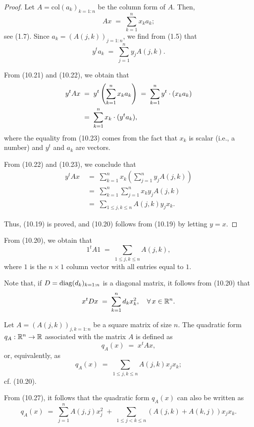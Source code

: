 \begin{proof}
Let $A = \mathrm{col}(a_k)_{k=1:n}$ be the column form of $A$. Then,
\begin{equation}
Ax \;=\; \sum_{k=1}^n x_ka_k;
\end{equation}
see (1.7). Since $a_k = (A(j,k))_{j=1:n}$, we find from (1.5) that
\begin{equation}
y^ta_k \;=\; \sum_{j=1}^n y_jA(j,k).
\end{equation}

From (10.21) and (10.22), we obtain that
\begin{align}
y^tAx \;&=\; y^t\left(\sum_{k=1}^n x_ka_k\right) \;=\; \sum_{k=1}^n y^t\cdot(x_ka_k) \notag \\
&=\; \sum_{k=1}^n x_k\cdot(y^ta_k),
\end{align}
where the equality from (10.23) comes from the fact that $x_k$ is scalar (i.e., a
number) and $y^t$ and $a_k$ are vectors.

From (10.22) and (10.23), we conclude that
\begin{align*}
y^tAx \;&=\; \sum_{k=1}^n x_k\left(\sum_{j=1}^n y_jA(j,k)\right) \\
&=\; \sum_{k=1}^n\sum_{j=1}^n x_ky_jA(j,k) \\
&=\; \sum_{1\le j,k\le n} A(j,k)y_jx_k.
\end{align*}

Thus, (10.19) is proved, and (10.20) follows from (10.19) by letting $y = x$.
\end{proof}

From (10.20), we obtain that
\begin{equation}
1^tA1 \;=\; \sum_{1\le j,k\le n} A(j,k),
\end{equation}
where $1$ is the $n \times 1$ column vector with all entries equal to $1$.

Note that, if $D = \operatorname{diag}(d_k)_{k=1:n}$ is a diagonal matrix, it follows from (10.20)
that
\begin{equation}
x^tDx \;=\; \sum_{k=1}^n d_kx_k^2, \quad \forall\, x \in \mathbb{R}^n.
\end{equation}

\begin{definition}
Let $A = (A(j,k))_{j,k=1:n}$ be a square matrix of size $n$. The quadratic form
$q_A : \mathbb{R}^n \to \mathbb{R}$ associated with the matrix $A$ is defined as
\begin{equation}
q_A(x) \;=\; x^tAx,
\end{equation}
or, equivalently, as
\begin{equation}
q_A(x) \;=\; \sum_{1\le j,k\le n} A(j,k)x_jx_k;
\end{equation}
cf. (10.20).
\end{definition}

From (10.27), it follows that the quadratic form $q_A(x)$ can also be written as
\begin{equation}
q_A(x) \;=\; \sum_{j=1}^n A(j,j)x_j^2 \;+\; \sum_{1\le j<k\le n} (A(j,k)+A(k,j))x_jx_k.
\end{equation}
